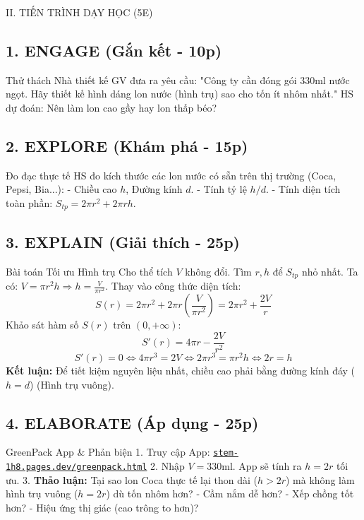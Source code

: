 \documentclass[12pt,a4paper]{article}
\begin{document}
\begin{sectionbox}{II. TIẾN TRÌNH DẠY HỌC (5E)}

\subsection*{1. ENGAGE (Gắn kết - 10p)}
\begin{activitybox}{Thử thách Nhà thiết kế}
GV đưa ra yêu cầu: "Công ty cần đóng gói 330ml nước ngọt. Hãy thiết kế hình dáng lon nước (hình trụ) sao cho tốn ít nhôm nhất."
HS dự đoán: Nên làm lon cao gầy hay lon thấp béo?
\end{activitybox}

\subsection*{2. EXPLORE (Khám phá - 15p)}
\begin{activitybox}{Đo đạc thực tế}
HS đo kích thước các lon nước có sẵn trên thị trường (Coca, Pepsi, Bia...):
- Chiều cao $h$, Đường kính $d$.
- Tính tỷ lệ $h/d$.
- Tính diện tích toàn phần: $S_{tp} = 2\pi r^2 + 2\pi rh$.
\end{activitybox}

\subsection*{3. EXPLAIN (Giải thích - 25p)}
\begin{mathbox}{Bài toán Tối ưu Hình trụ}
Cho thể tích $V$ không đổi. Tìm $r, h$ để $S_{tp}$ nhỏ nhất.
Ta có: $V = \pi r^2 h \Rightarrow h = \frac{V}{\pi r^2}$.
Thay vào công thức diện tích:
$$ S(r) = 2\pi r^2 + 2\pi r \left(\frac{V}{\pi r^2}\right) = 2\pi r^2 + \frac{2V}{r} $$
Khảo sát hàm số $S(r)$ trên $(0, +\infty)$:
$$ S'(r) = 4\pi r - \frac{2V}{r^2} $$
$$ S'(r) = 0 \Leftrightarrow 4\pi r^3 = 2V \Leftrightarrow 2\pi r^3 = \pi r^2 h \Leftrightarrow 2r = h $$
\textbf{Kết luận:} Để tiết kiệm nguyên liệu nhất, chiều cao phải bằng đường kính đáy ($h=d$) (Hình trụ vuông).
\end{mathbox}

\subsection*{4. ELABORATE (Áp dụng - 25p)}
\begin{activitybox}{GreenPack App \& Phản biện}
1. Truy cập App: \href{https://stem-1h8.pages.dev/greenpack.html}{\texttt{stem-1h8.pages.dev/greenpack.html}}
2. Nhập $V=330$ml. App sẽ tính ra $h=2r$ tối ưu.
3. \textbf{Thảo luận:} Tại sao lon Coca thực tế lại thon dài ($h > 2r$) mà không làm hình trụ vuông ($h=2r$) dù tốn nhôm hơn?
   - Cầm nắm dễ hơn?
   - Xếp chồng tốt hơn?
   - Hiệu ứng thị giác (cao trông to hơn)?
\end{activitybox}


\end{sectionbox}
\end{document}
